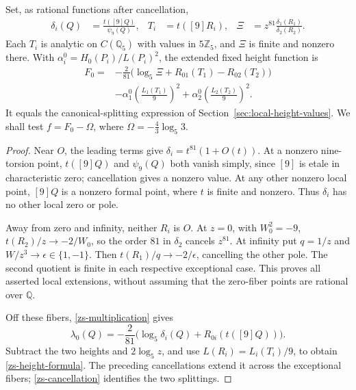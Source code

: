 \begin{proposition}
\label{zs-expression}
Set, as rational functions after cancellation,
\begin{align}
 \delta_i(Q)&=\frac{t([9]Q)}{\psi_9(Q)},&
 T_i&=t([9]R_i),&
 \Xi&=z^{81}\frac{\delta_1(R_1)}{\delta_2(R_2)}.
 \label{zs-rational-functions}
\end{align}
Each \(T_i\) is analytic on \(C(\mathbb Q_5)\) with values in
\(5\mathbb Z_5\), and \(\Xi\) is finite and nonzero there.
With \(\alpha_i^0=H_0(P_i)/L(P_i)^2\), the extended fixed height
function is
\begin{align}
 F_0={}&-\frac2{81}\bigl(\log_5\Xi+R_{01}(T_1)-R_{02}(T_2)\bigr)
 \nonumber\\
 &-\alpha_1^0\left(\frac{L_1(T_1)}9\right)^2
  +\alpha_2^0\left(\frac{L_2(T_2)}9\right)^2.
 \label{zs-height-formula}
\end{align}
It equals the canonical-splitting expression of
Section~\ref{sec:local-height-values}. We shall test
\(f=F_0-\Omega\), where \(\Omega=-\frac43\log_5 3\).
\end{proposition}
\begin{proof}
Near \(O\), the leading terms give
\(\delta_i=t^{81}(1+O(t))\). At a nonzero nine-torsion point,
\(t([9]Q)\) and \(\psi_9(Q)\) both vanish simply, since \([9]\)
is etale in characteristic zero; cancellation gives a nonzero value.
At any other nonzero local point, \([9]Q\) is a nonzero formal point,
where \(t\) is finite and nonzero. Thus \(\delta_i\) has no other
local zero or pole.

Away from zero and infinity, neither \(R_i\) is \(O\). At \(z=0\),
with \(W_0^2=-9\),
\(t(R_2)/z\longrightarrow-2/W_0\), so the order \(81\) in
\(\delta_2\) cancels \(z^{81}\). At infinity put \(q=1/z\) and
\(W/z^3\longrightarrow\epsilon\in\{1,-1\}\). Then
\(t(R_1)/q\longrightarrow-2/\epsilon\), cancelling the other pole.
The second quotient is finite in each respective exceptional case.
This proves all asserted local extensions, without assuming that the
zero-fiber points are rational over \(\mathbb Q\).

Off these fibers, \eqref{zs-multiplication} gives
\[
 \lambda_0(Q)=-\frac2{81}\bigl(\log_5\delta_i(Q)+R_{0i}(t([9]Q))\bigr).
\]
Subtract the two heights and \(2\log_5z\), and use
\(L(R_i)=L_i(T_i)/9\), to obtain \eqref{zs-height-formula}.
The preceding cancellations extend it across the exceptional fibers;
\eqref{zs-cancellation} identifies the two splittings.
\end{proof}

